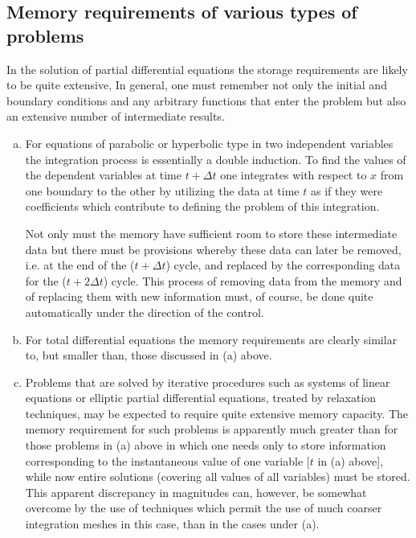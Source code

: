 \documentclass[12pt]{amsart}
\begin{document}
\subsection{Memory requirements of various types of problems}
In the solution of partial differential equations the storage requirements are likely to be quite extensive, In general, one must remember not only the initial and boundary conditions and any arbitrary functions that enter the problem but also an extensive number of intermediate results.

\begin{enumerate}[a)]
\item For equations of parabolic or hyperbolic type in two independent variables the integration process is essentially a double induction. To find the values of the dependent variables at time $t + \Delta t$ one integrates with respect to $x$ from one boundary to the other by utilizing the data at time $t$ as if they were coefficients which contribute to defining the problem of this integration.

Not only must the memory have sufficient room to store these intermediate data but there must be provisions whereby these data can later be removed, i.e. at the end of the ($t + \Delta t$) cycle, and replaced by the corresponding data for the ($t + 2\Delta t$) cycle. This process of removing data from the memory and of replacing them with new information must, of course, be done quite automatically under the direction of the control.

\item For total differential equations the memory requirements are clearly similar to, but smaller than, those discussed in (a) above.

\item Problems that are solved by iterative procedures such as systems of linear equations or elliptic partial differential equations, treated by relaxation techniques, may be expected to require quite extensive memory capacity. The memory requirement for such problems is apparently much greater than for those problems in (a) above in which one needs only to store information corresponding to the instantaneous value of one variable [$t$ in (a) above], while now entire solutions (covering all values of all variables) must be stored. This apparent discrepancy in magnitudes can, however, be somewhat overcome by the use of techniques which permit the use of much coarser integration meshes in this case, than in the cases under (a).
\end{enumerate}
\end{document}
